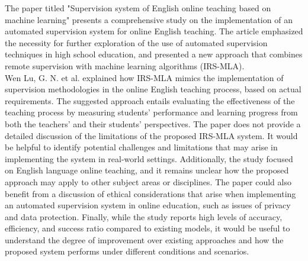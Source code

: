 The paper titled "Supervision system of English online teaching based on machine learning" presents a comprehensive study on the implementation of an automated supervision system for online English teaching. The article emphasized the necessity for further exploration of the use of automated supervision techniques in high school education, and presented a new approach that combines remote supervision with machine learning algorithms (IRS-MLA).\\ Wen Lu, G. N. et al. explained how IRS-MLA mimics the implementation of supervision methodologies in the online English teaching process, based on actual requirements. The suggested approach entails evaluating the effectiveness of the teaching process by measuring students' performance and learning progress from both the teachers' and their students' perspectives. The paper does not provide a detailed discussion of the limitations of the proposed IRS-MLA system. It would be helpful to identify potential challenges and limitations that may arise in implementing the system in real-world settings. Additionally, the study focused on English language online teaching, and it remains unclear how the proposed approach may apply to other subject areas or disciplines. The paper could also benefit from a discussion of ethical considerations that arise when implementing an automated supervision system in online education, such as issues of privacy and data protection. Finally, while the study reports high levels of accuracy, efficiency, and success ratio compared to existing models, it would be useful to understand the degree of improvement over existing approaches and how the proposed system performs under different conditions and scenarios.\cite{lu2022supervision}\\

